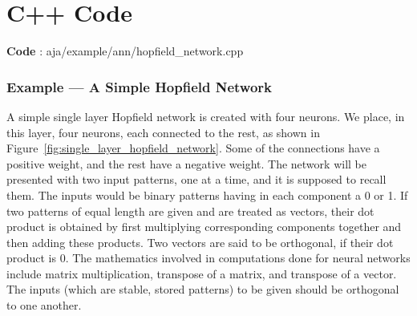 \documentclass[12pt, right open]{memoir}
\begin{document}
\chapter{C++ Code}

\textbf{Code} :  aja/example/ann/hopfield\_network.cpp

\subsection {Example — A Simple Hopfield Network}
\label{sec:example_a_simple_hopfield_network}
A simple single layer Hopfield network is created with four neurons. We place, in
this layer, four neurons, each connected to the rest, as shown in Figure~\ref{fig:single_layer_hopfield_network}. Some of the connections have a positive weight, 
and the rest have a negative weight. The network
will be presented with two input patterns, one at a time, and it is supposed to recall them.
The inputs would be binary patterns having in each component a 0 or 1. If two patterns
of equal length are given and are treated as vectors, their dot product is obtained by first
multiplying corresponding components together and then adding these products. Two
vectors are said to be orthogonal, if their dot product is 0. The mathematics involved in
computations done for neural networks include matrix multiplication, transpose of a
matrix, and transpose of a vector. The inputs (which are stable, stored patterns) to be given should be orthogonal to one another.
\end{document}
